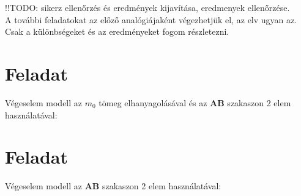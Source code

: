 \documentclass{article}
\begin{document}
		!!TODO: sikerz ellenőrzés és eredmények kijavítása, eredmenyek ellenőrzése. \\
		
		
		
		A további feladatokat az előző analógiájaként végezhetjük el, az elv ugyan az. 
		Csak a különbségeket és az eredményeket fogom részletezni.
	
	
	\section{Feladat}
		
	Végeselem modell az $m_{0}$ tömeg elhanyagolásával és az \textbf{AB} szakaszon 2 elem használatával:
	
	\begin{figure}[h!]		
		\begin{center}	
		\end{center}	
	\caption{}
	\end{figure}
	
	\section{Feladat}
	
	Végeselem modell az \textbf{AB} szakaszon 2 elem használatával:
	
\end{document}
